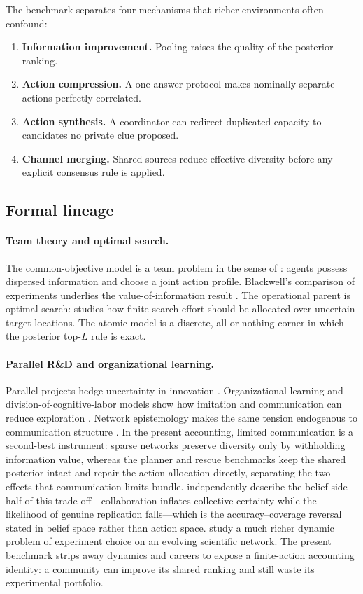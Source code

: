 \documentclass[11pt]{article}
\theoremstyle{definition}
\theoremstyle{remark}
\newcommand{\1}{\mathbf{1}}
\begin{document}
The benchmark separates four mechanisms that richer environments often confound:
\begin{enumerate}
\item \textbf{Information improvement.} Pooling raises the quality of the posterior ranking.
\item \textbf{Action compression.} A one-answer protocol makes nominally separate actions perfectly correlated.
\item \textbf{Action synthesis.} A coordinator can redirect duplicated capacity to candidates no private clue proposed.
\item \textbf{Channel merging.} Shared sources reduce effective diversity before any explicit consensus rule is applied.
\end{enumerate}

\subsection{Formal lineage}

\paragraph{Team theory and optimal search.}
The common-objective model is a team problem in the sense of \citet{MarschakRadner1972}: agents possess dispersed information and choose a joint action profile. Blackwell's comparison of experiments underlies the value-of-information result \citep{Blackwell1953}. The operational parent is optimal search: \citet{Koopman1957} studies how finite search effort should be allocated over uncertain target locations. The atomic model is a discrete, all-or-nothing corner in which the posterior top-$L$ rule is exact.

\paragraph{Parallel R\&D and organizational learning.}
Parallel projects hedge uncertainty in innovation \citep{Nelson1961}. Organizational-learning and division-of-cognitive-labor models show how imitation and communication can reduce exploration \citep{March1991,Kitcher1990}. Network epistemology makes the same tension endogenous to communication structure \citep{Zollman2007,MayoWilsonEtAl2011}. In the present accounting, limited communication is a second-best instrument: sparse networks preserve diversity only by withholding information value, whereas the planner and rescue benchmarks keep the shared posterior intact and repair the action allocation directly, separating the two effects that communication limits bundle. \citet{DuedeEvans2024} independently describe the belief-side half of this trade-off---collaboration inflates collective certainty while the likelihood of genuine replication falls---which is the accuracy--coverage reversal stated in belief space rather than action space. \citet{RzhetskyEtAl2015} study a much richer dynamic problem of experiment choice on an evolving scientific network. The present benchmark strips away dynamics and careers to expose a finite-action accounting identity: a community can improve its shared ranking and still waste its experimental portfolio.
\end{document}
